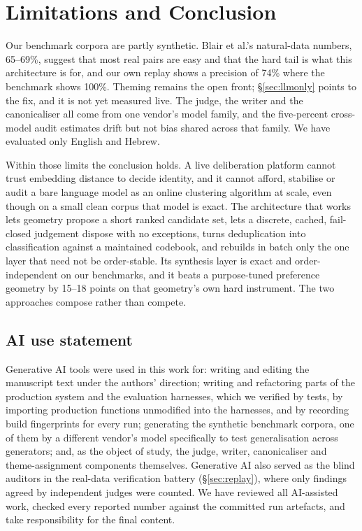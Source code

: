 \documentclass{article}
\newcommand{\bpt}{Blair et al.\xspace}
\begin{document}
\section{Limitations and Conclusion}
Our benchmark corpora are partly synthetic. \bpt's natural-data numbers, 65--69\%, suggest that most real pairs are easy and that the hard tail is what this architecture is for, and our own replay shows a precision of 74\% where the benchmark shows 100\%. Theming remains the open front; \S\ref{sec:llmonly} points to the fix, and it is not yet measured live. The judge, the writer and the canonicaliser all come from one vendor's model family, and the five-percent cross-model audit estimates drift but not bias shared across that family. We have evaluated only English and Hebrew.

Within those limits the conclusion holds. A live deliberation platform cannot trust embedding distance to decide identity, and it cannot afford, stabilise or audit a bare language model as an online clustering algorithm at scale, even though on a small clean corpus that model is exact. The architecture that works lets geometry propose a short ranked candidate set, lets a discrete, cached, fail-closed judgement dispose with no exceptions, turns deduplication into classification against a maintained codebook, and rebuilds in batch only the one layer that need not be order-stable. Its synthesis layer is exact and order-independent on our benchmarks, and it beats a purpose-tuned preference geometry by 15--18 points on that geometry's own hard instrument. The two approaches compose rather than compete.

\subsection*{AI use statement}
Generative AI tools were used in this work for: writing and editing the manuscript text under the authors' direction; writing and refactoring parts of the production system and the evaluation harnesses, which we verified by tests, by importing production functions unmodified into the harnesses, and by recording build fingerprints for every run; generating the synthetic benchmark corpora, one of them by a different vendor's model specifically to test generalisation across generators; and, as the object of study, the judge, writer, canonicaliser and theme-assignment components themselves. Generative AI also served as the blind auditors in the real-data verification battery (\S\ref{sec:replay}), where only findings agreed by independent judges were counted. We have reviewed all AI-assisted work, checked every reported number against the committed run artefacts, and take responsibility for the final content.
\end{document}
